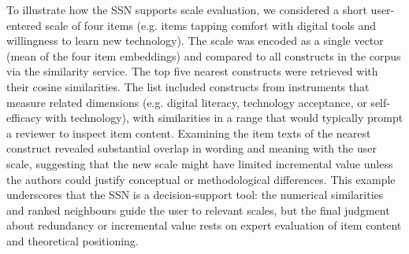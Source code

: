 \documentclass[11pt]{article}
\begin{document}
To illustrate how the SSN supports scale evaluation, we considered a short user-entered scale of four items (e.g. items tapping comfort with digital tools and willingness to learn new technology). The scale was encoded as a single vector (mean of the four item embeddings) and compared to all constructs in the corpus via the similarity service. The top five nearest constructs were retrieved with their cosine similarities. The list included constructs from instruments that measure related dimensions (e.g. digital literacy, technology acceptance, or self-efficacy with technology), with similarities in a range that would typically prompt a reviewer to inspect item content. Examining the item texts of the nearest construct revealed substantial overlap in wording and meaning with the user scale, suggesting that the new scale might have limited incremental value unless the authors could justify conceptual or methodological differences. This example underscores that the SSN is a decision-support tool: the numerical similarities and ranked neighbours guide the user to relevant scales, but the final judgment about redundancy or incremental value rests on expert evaluation of item content and theoretical positioning.
\end{document}
